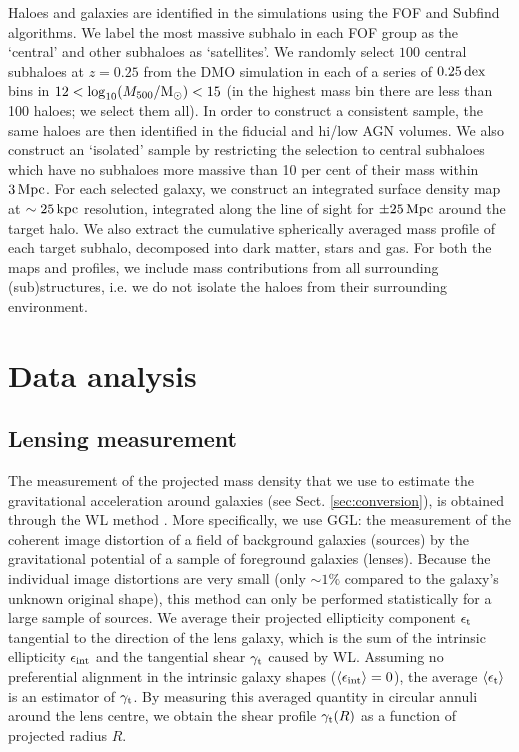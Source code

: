 \documentclass[usenatbib]{mnras}
\newcommand{\lan}{\langle}
\newcommand{\ran}{\rangle}
\newcommand{\un}[1]{_{\rm #1}}
\begin{document}

Haloes and galaxies are identified in the simulations using the FOF \citep{davis1985} and Subfind \citep{springel2001,dolag2009} algorithms. We label the most massive subhalo in each FOF group as the `central' and other subhaloes as `satellites'.  We randomly select $100$ central subhaloes at $z=0.25$ from the DMO simulation in each of a series of $0.25\,{\rm dex}$ bins in $12 < \log_{10}(M_{500}/{\rm M}_\odot) < 15$ (in the highest mass bin there are less than 100 haloes; we select them all). In order to construct a consistent sample, the same haloes are then identified in the fiducial and hi/low AGN volumes. We also construct an `isolated' sample by restricting the selection to central subhaloes which have no subhaloes more massive than 10 per cent of their mass within $3\,{\rm Mpc}$. For each selected galaxy, we construct an integrated surface density map at $\sim 25\,{\rm kpc}$ resolution, integrated along the line of sight for $\pm 25\,{\rm Mpc}$ around the target halo. We also extract the cumulative spherically averaged mass profile of each target subhalo, decomposed into dark matter, stars and gas. For both the maps and profiles, we include mass contributions from all surrounding (sub)structures, i.e. we do not isolate the haloes from their surrounding environment.


\section{Data analysis}
\label{sec:analysis}

\subsection{Lensing measurement}
\label{sec:lensing}

The measurement of the projected mass density that we use to estimate the gravitational acceleration around galaxies (see Sect. \ref{sec:conversion}), is obtained through the WL method \cite[for a general introduction, see][]{bartelmann2001,schneider2006}. More specifically, we use GGL: the measurement of the coherent image distortion of a field of background galaxies (sources) by the gravitational potential of a sample of foreground galaxies (lenses). Because the individual image distortions are very small (only $\sim1\%$ compared to the galaxy's unknown original shape), this method can only be performed statistically for a large sample of sources. We average their projected ellipticity component $\epsilon\un{t}$ tangential to the direction of the lens galaxy, which is the sum of the intrinsic ellipticity $\epsilon\un{int}$ and the tangential shear $\gamma\un{t}$ caused by WL. Assuming no preferential alignment in the intrinsic galaxy shapes ($\lan\epsilon\un{int}\ran=0$), the average $\lan\epsilon\un{t}\ran$ is an estimator of $\gamma\un{t}$. By measuring this averaged quantity in circular annuli around the lens centre, we obtain the shear profile $\gamma\un{t}(R)$ as a function of projected radius $R$.
\end{document}
